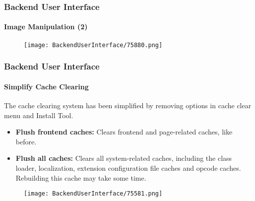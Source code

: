 \begin{frame}[fragile]
	\frametitle{Backend User Interface}
	\framesubtitle{Image Manipulation (2)}

	\begin{figure}\vspace*{-0.6cm}
		\texttt{[image: BackendUserInterface/75880.png]}
	\end{figure}

\end{frame}


\begin{frame}[fragile]
	\frametitle{Backend User Interface}
	\framesubtitle{Simplify Cache Clearing}

	The cache clearing system has been simplified by removing options in cache clear menu and
	Install Tool.

	\begin{itemize}

		\item \textbf{Flush frontend caches:}\newline
			\small
				Clears frontend and page-related caches, like before.
			\normalsize

		\item \textbf{Flush all caches:}\newline
			\small
				Clears all system-related caches, including the class loader, localization,
				extension configuration file caches and opcode caches. Rebuilding this cache
				may take some time.
			\normalsize

	\end{itemize}

	\begin{figure}
		\texttt{[image: BackendUserInterface/75581.png]}
	\end{figure}

\end{frame}

